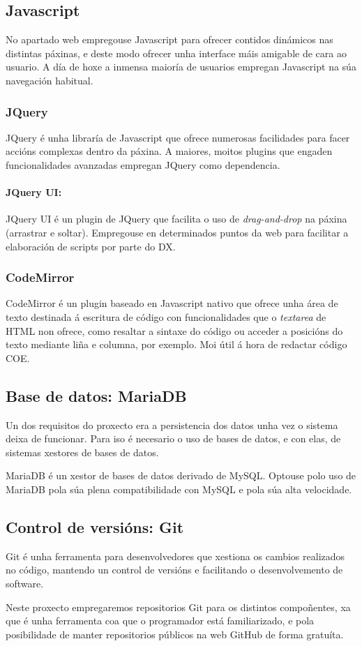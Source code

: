 \subsection{Javascript}
No apartado web empregouse Javascript para ofrecer contidos dinámicos nas
distintas páxinas, e deste modo ofrecer unha interface máis amigable de cara ao
usuario. A día de hoxe a inmensa maioría de usuarios empregan Javascript na súa
navegación habitual.

\subsubsection{JQuery}
JQuery é unha libraría de Javascript que ofrece numerosas facilidades para facer
accións complexas dentro da páxina. A maiores, moitos plugins que engaden
funcionalidades avanzadas empregan JQuery como dependencia.

\paragraph{JQuery UI:}
JQuery UI é un plugin de JQuery que facilita o uso de \textit{drag-and-drop} na
páxina (arrastrar e soltar). Empregouse en determinados puntos da web para
facilitar a elaboración de scripts por parte do DX.

\subsubsection{CodeMirror}
CodeMirror é un plugin baseado en Javascript nativo que ofrece unha área de
texto destinada á escritura de código con funcionalidades que o
\textit{textarea} de HTML non ofrece, como resaltar a sintaxe do código ou
acceder a posicións do texto mediante liña e columna, por exemplo. Moi útil á
hora de redactar código COE.

\subsection{Base de datos: MariaDB}
Un dos requisitos do proxecto era a persistencia dos datos unha vez o sistema
deixa de funcionar. Para iso é necesario o uso de bases de datos, e con elas, de
sistemas xestores de bases de datos.
\par MariaDB é un xestor de bases de datos derivado de MySQL. Optouse polo uso
de MariaDB pola súa plena compatibilidade con MySQL e pola súa alta velocidade.

\subsection{Control de versións: Git}
Git é unha ferramenta para desenvolvedores que xestiona os cambios realizados no
código, mantendo un control de versións e facilitando o desenvolvemento de
software.
\par
Neste proxecto empregaremos repositorios Git para os distintos compoñentes, xa
que é unha ferramenta coa que o programador está familiarizado, e pola
posibilidade de manter repositorios públicos na web GitHub de forma gratuíta.